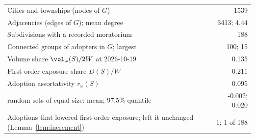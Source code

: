 \begin{tabular}{lr}
\toprule
Cities and townships (nodes of $G$) & 1539 \\
Adjacencies (edges of $G$); mean degree & 3413; 4.44 \\
Subdivisions with a recorded moratorium & 188 \\
Connected groups of adopters in $G$; largest & 100; 15 \\
Volume share $\vol_\omega(S)/2W$ at 2026-10-19 & 0.135 \\
First-order exposure share $D(S)/W$ & 0.211 \\
Adoption assortativity $r_\omega(S)$ & 0.095 \\
\quad random sets of equal size: mean; 97.5\% quantile & -0.002; 0.020 \\
Adoptions that lowered first-order exposure; left it unchanged (Lemma~\ref{lem:increment}) & 1; 1 of 188 \\
\bottomrule
\end{tabular}
